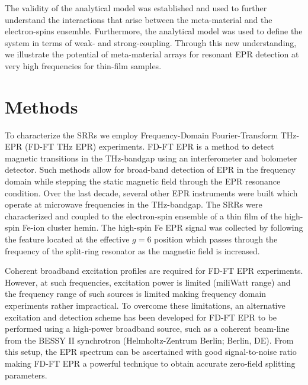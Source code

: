 The validity of the analytical model was established and used to further understand the interactions that arise between the meta-material and the electron-spins ensemble. Furthermore, the analytical model was used to define the system in terms of weak- and strong-coupling. Through this new understanding, we illustrate the potential of meta-material arrays for resonant EPR detection at very high frequencies for thin-film samples. 

\section{Methods}
To characterize the SRRs we employ Frequency-Domain Fourier-Transform THz-EPR (FD-FT THz EPR) experiments. FD-FT EPR is a method to detect magnetic transitions in the THz-bandgap using an interferometer and bolometer detector. \cite{Schnegg09,NEHRKORN201710} Such methods allow for broad-band detection of EPR in the frequency domain while stepping the static magnetic field through the EPR resonance condition. Over the last decade, several other EPR instruments were built which operate at microwave frequencies in the THz-bandgap. \cite{Disselhorst95, Hassan00, vanTol05, Zvyagin09, Takahashi09, C7CP07443C, Lu2017} The SRRs were characterized and coupled to the electron-spin ensemble of a thin film of the high-spin Fe-ion cluster hemin. The high-spin Fe EPR signal was collected by following the feature located at the effective $g=6$ position which passes through the frequency of the split-ring resonator as the magnetic field is increased. 

Coherent broadband excitation profiles are required for FD-FT EPR experiments. However, at such frequencies, excitation power is limited (miliWatt range) and the frequency range of such sources is limited making frequency domain experiments rather impractical. To overcome these limitations, an alternative excitation and detection scheme has been developed for FD-FT EPR to be performed using a high-power broadband source, such as a coherent beam-line from the BESSY II synchrotron (Helmholtz-Zentrum Berlin; Berlin, DE). From this setup, the EPR spectrum can be ascertained with good signal-to-noise ratio making FD-FT EPR a powerful technique to obtain accurate zero-field splitting parameters. \cite{Nehrkorn13,Nehrkorn15,NEHRKORN201710}

